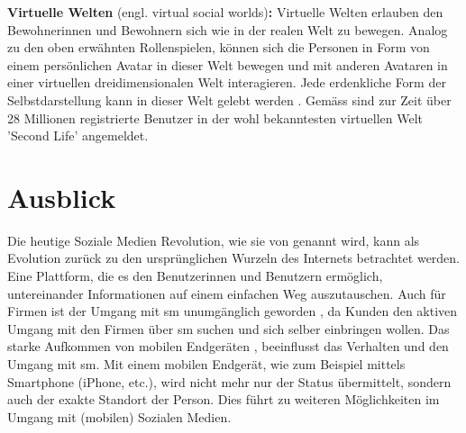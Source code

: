 \textbf{Virtuelle Welten} (engl. virtual social worlds)\textbf{:} Virtuelle Welten erlauben den Bewohnerinnen und Bewohnern sich wie in der realen Welt zu bewegen. Analog zu den oben erwähnten Rollenspielen, können sich die Personen in Form von einem persönlichen Avatar in dieser Welt bewegen und mit anderen Avataren in einer virtuellen dreidimensionalen Welt interagieren. Jede erdenkliche Form der Selbstdarstellung kann in dieser Welt gelebt werden \cite{Kaplan:2010}. Gemäss  sind zur Zeit über 28 Millionen registrierte Benutzer in der wohl bekanntesten virtuellen Welt 'Second Life' angemeldet.
\section{Ausblick}\label{sec.ausblick}
Die heutige Soziale Medien Revolution, wie sie von  genannt wird, kann als Evolution zurück zu den ursprünglichen Wurzeln des Internets betrachtet werden. Eine Plattform, die es den Benutzerinnen und Benutzern ermöglich, untereinander Informationen auf einem einfachen Weg auszutauschen. Auch für Firmen ist der Umgang mit \gls{sm} unumgänglich geworden \cite{Kietzmann:2011}, da Kunden den aktiven Umgang mit den Firmen über \gls{sm} suchen und sich selber einbringen wollen.\newline
Das starke Aufkommen von mobilen Endgeräten \cite{Kaplan:2012}, beeinflusst das Verhalten und den Umgang mit \gls{sm}. Mit einem mobilen Endgerät, wie zum Beispiel mittels Smartphone (iPhone, etc.), wird nicht mehr nur der Status übermittelt, sondern auch der exakte Standort der Person. Dies führt zu weiteren Möglichkeiten im Umgang mit (mobilen) Sozialen Medien. \newline
  





